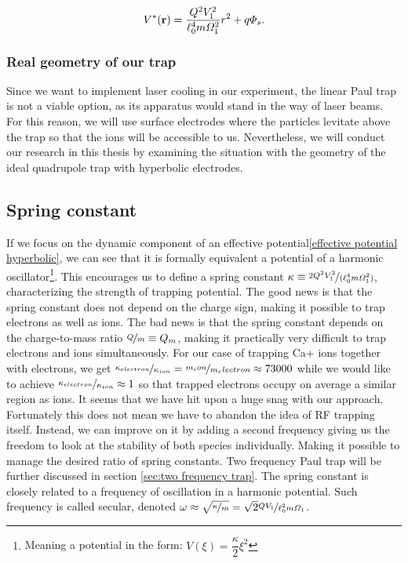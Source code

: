 \begin{equation}
	\label{effective potential hyperbolic}
	V^*(\vb{r}) = \dfrac{Q^2 V_1^2}{\ell_0^4 m \Omega_1^2} r^2 + q\Phi_s.
\end{equation}

\subsubsection{Real geometry of our trap}
Since we want to implement laser cooling in our experiment, the linear Paul trap is not a viable option, as its apparatus would stand in the way of laser beams. For this reason, we will use surface electrodes where the particles levitate above the trap so that the ions will be accessible to us. Nevertheless, we will conduct our research in this thesis by examining the situation with the geometry of the ideal quadrupole trap with hyperbolic electrodes.

\subsection{Spring constant}

If we focus on the dynamic component of an effective potential\eqref{effective potential hyperbolic}, we can see that it is formally equivalent a potential of a harmonic oscillator\footnote{Meaning a potential in the form: $V(\xi) = \dfrac{\kappa}{2} \xi^2$}. This encourages us to define a spring constant $\kappa \equiv \nicefrac{2 Q^2 V_1^2}{(\ell_0^4 m \Omega_1^2)}$, characterizing the strength of trapping potential. The good news is that the spring constant does not depend on the charge sign, making it possible to trap electrons as well as ions. The bad news is that the spring constant depends on the charge-to-mass ratio $\nicefrac{Q}{m} \equiv Q_m$, making it practically very difficult to trap electrons and ions simultaneously. For our case of trapping Ca+ ions together with electrons, we get $\nicefrac{\kappa_{electron}}{\kappa_{ion}} = \nicefrac{m_ion}{m_electron} \approx 73000$ while we would like to achieve $\nicefrac{\kappa_{electron}}{\kappa_{ion}} \approx 1$ so that trapped electrons occupy on average a similar region as ions. It seems that we have hit upon a huge snag with our approach. Fortunately this does not mean we have to abandon the idea of RF trapping itself. Instead, we can improve on it by adding a second frequency giving us the freedom to look at the stability of both species individually. Making it possible to manage the desired ratio of spring constants. Two frequency Paul trap will be further discussed in section \ref{sec:two frequency trap}. The spring constant is closely related to a frequency of oscillation in a harmonic potential. Such frequency is called secular, denoted $\omega \approx \sqrt{\nicefrac{\kappa}{m}} = \sqrt{2} \nicefrac{Q V_1}{\ell_0^2 m \Omega_1}$.

